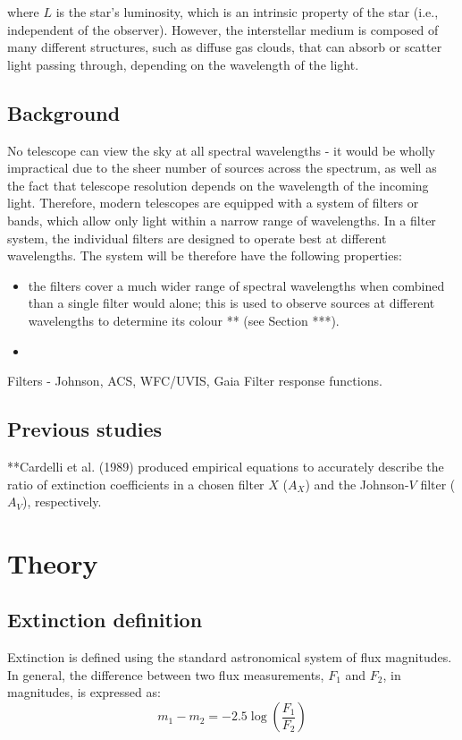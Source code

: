 \documentclass[a4paper, 11pt, oneside]{LJMU_Astro_Thesis}  %
\begin{document}
where $L$ is the star's luminosity, which is an intrinsic property of the star (i.e., independent of the observer).
However, the interstellar medium is composed of many different structures, such as diffuse gas clouds, that can absorb or scatter light passing through, depending on the wavelength of the light.

\section{Background}
No telescope can view the sky at all spectral wavelengths - it would be wholly impractical due to the sheer number of sources across the spectrum, as well as the fact that telescope resolution depends on the wavelength of the incoming light. Therefore, modern telescopes are equipped with a system of filters or bands, which allow only light within a narrow range of wavelengths. In a filter system, the individual filters are designed to operate best at different wavelengths. The system will be therefore have the following properties:
\begin{itemize}
\item the filters cover a much wider range of spectral wavelengths when combined than a single filter would alone; this is used to observe sources at different wavelengths to determine its colour ** (see Section ***).
\item 
\end{itemize}
Filters - Johnson, ACS, WFC/UVIS, Gaia
Filter response functions.

\section{Previous studies}
**Cardelli et al. (1989) produced empirical equations to accurately describe the ratio of extinction coefficients in a chosen filter $X$ ($A_{X}$) and the Johnson-$V$ filter ($A_{V}$), respectively.



\chapter{Theory}
\section{Extinction definition}
Extinction is defined using the standard astronomical system of flux magnitudes. In general, the difference between two flux measurements, $F_{1}$ and $F_{2}$, in magnitudes, is expressed as:
\begin{equation}
\label{mags_def}
m_{1} - m_{2} = -2.5\log \left( \frac{F_{1}}{F_{2}} \right)
\end{equation}
\end{document}
